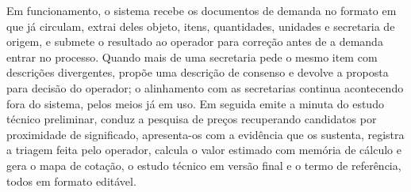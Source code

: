 Em funcionamento, o sistema recebe os documentos de demanda no formato em que já
circulam, extrai deles objeto, itens, quantidades, unidades e secretaria de
origem, e submete o resultado ao operador para correção antes de a demanda entrar
no processo. Quando mais de uma secretaria pede o mesmo item com descrições
divergentes, propõe uma descrição de consenso e devolve a proposta para decisão
do operador; o alinhamento com as secretarias continua acontecendo fora do
sistema, pelos meios já em uso. Em seguida emite a minuta do estudo técnico
preliminar, conduz a pesquisa de preços recuperando candidatos por proximidade de
significado, apresenta-os com a evidência que os sustenta, registra a triagem
feita pelo operador, calcula o valor estimado com memória de cálculo e gera o
mapa de cotação, o estudo técnico em versão final e o termo de referência, todos
em formato editável.

